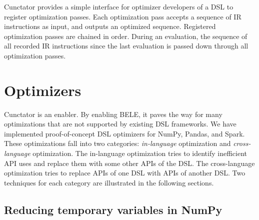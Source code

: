 \documentclass[sigconf]{acmart}\settopmatter{printfolios=true,printccs=false,printacmref=false}\setcopyright{none}
\begin{document}

Cunctator provides a simple interface for optimizer developers of a DSL to register optimization passes. Each optimization pass accepts a sequence of IR instructions as input, and outputs an optimized sequence. Registered optimization passes are chained in order. During an evaluation, the sequence of all recorded IR instructions since the last evaluation is passed down through all optimization passes.






\section{Optimizers}
\label{sec:optimizers}
Cunctator is an enabler. By enabling BELE, it paves the way for many optimizations that are not supported by existing DSL frameworks. We have implemented proof-of-concept DSL optimizers for NumPy, Pandas, and Spark. These optimizations fall into two categories: \textit{in-language} optimization and \textit{cross-language} optimization. The in-language optimization tries to identify inefficient API uses and replace them with some other APIs of the DSL. The cross-language optimization tries to replace APIs of one DSL with APIs of another DSL. Two techniques for each category are illustrated in the following sections.


\subsection{Reducing temporary variables in NumPy}
\end{document}

